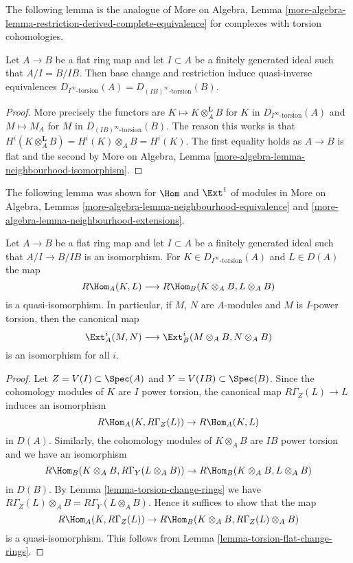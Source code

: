 \noindent
The following lemma is the analogue of
More on Algebra, Lemma
\ref{more-algebra-lemma-restriction-derived-complete-equivalence}
for complexes with torsion cohomologies.

\begin{lemma}
\label{lemma-torsion-flat-change-rings}
Let $A \to B$ be a flat ring map and let $I \subset A$ be a finitely
generated ideal such that $A/I = B/IB$. Then base change and
restriction induce quasi-inverse equivalences
$D_{I^\infty\text{-torsion}}(A) = D_{(IB)^\infty\text{-torsion}}(B)$.
\end{lemma}

\begin{proof}
More precisely the functors are $K \mapsto K \otimes_A^\mathbf{L} B$
for $K$ in $D_{I^\infty\text{-torsion}}(A)$ and $M \mapsto M_A$
for $M$ in $D_{(IB)^\infty\text{-torsion}}(B)$. The reason this works
is that $H^i(K \otimes_A^\mathbf{L} B) = H^i(K) \otimes_A B = H^i(K)$.
The first equality holds as $A \to B$ is flat and the second by
More on Algebra, Lemma \ref{more-algebra-lemma-neighbourhood-isomorphism}.
\end{proof}

\noindent
The following lemma was shown for $\Hom$ and $\Ext^1$ of modules in
More on Algebra, Lemmas \ref{more-algebra-lemma-neighbourhood-equivalence} and
\ref{more-algebra-lemma-neighbourhood-extensions}.

\begin{lemma}
\label{lemma-neighbourhood-extensions}
Let $A \to B$ be a flat ring map and let $I \subset A$ be a
finitely generated ideal such that $A/I \to B/IB$ is an isomorphism.
For $K \in D_{I^\infty\text{-torsion}}(A)$ and $L \in D(A)$
the map
$$
R\Hom_A(K, L) \longrightarrow R\Hom_B(K \otimes_A B, L \otimes_A B)
$$
is a quasi-isomorphism. In particular, if $M$, $N$ are $A$-modules and
$M$ is $I$-power torsion, then the canonical map
$$
\Ext^i_A(M, N)
\longrightarrow
\Ext^i_B(M \otimes_A B, N \otimes_A B)
$$
is an isomorphism for all $i$. 
\end{lemma}

\begin{proof}
Let $Z = V(I) \subset \Spec(A)$ and $Y = V(IB) \subset \Spec(B)$.
Since the cohomology modules of $K$ are $I$ power torsion, the
canonical map $R\Gamma_Z(L) \to L$ induces an isomorphism
$$
R\Hom_A(K, R\Gamma_Z(L)) \to R\Hom_A(K, L)
$$
in $D(A)$. Similarly, the cohomology modules of $K \otimes_A B$ are
$IB$ power torsion and we have an isomorphism
$$
R\Hom_B(K \otimes_A B, R\Gamma_Y(L \otimes_A B)) \to 
R\Hom_B(K \otimes_A B, L \otimes_A B)
$$
in $D(B)$.
By Lemma \ref{lemma-torsion-change-rings} we have
$R\Gamma_Z(L) \otimes_A B = R\Gamma_Y(L \otimes_A B)$.
Hence it suffices to show that the map
$$
R\Hom_A(K, R\Gamma_Z(L)) \to R\Hom_B(K \otimes_A B, R\Gamma_Z(L) \otimes_A B)
$$
is a quasi-isomorphism. This follows from
Lemma \ref{lemma-torsion-flat-change-rings}.
\end{proof}




